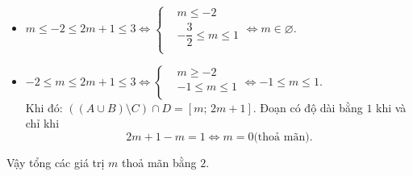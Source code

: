 \begin{ex}
{\begin{enumerate}[+)]
\begin{itemize}
Đoạn có độ dài bằng $1$ khi và chỉ khi \[3-m=1\Leftrightarrow m=2 \text{(thoả mãn)}.\]
\item $m\le -2\le 2m+1\le 3\Leftrightarrow \left\{ \begin{aligned}
& m\le -2 \\
& -\dfrac{3}{2}\le m\le 1 \\
\end{aligned} \right.\Leftrightarrow m\in \varnothing $.
\item $-2\le m\le 2m+1\le 3\Leftrightarrow \left\{ \begin{aligned}
& m\ge -2 \\
& -1\le m\le 1 \\
\end{aligned} \right.\Leftrightarrow -1\le m\le 1$.\\
Khi đó: $\left( \left( A\cup B \right)\setminus C \right)\cap D=\left[ m;\,2m+1 \right]$.
Đoạn có độ dài bằng $1$ khi và chỉ khi \[2m+1-m=1\Leftrightarrow m=0 \text{(thoả mãn)}.\]
\end{itemize}
\end{enumerate}
Vậy tổng các giá trị $m$ thoả mãn bằng $2$.}
\end{ex}

